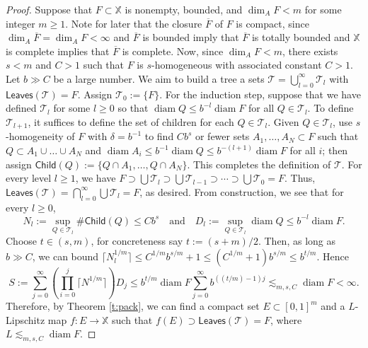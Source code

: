 \documentclass[12pt]{amsart}
\theoremstyle{definition}
\theoremstyle{remark}
\newcommand{\XX}{\mathbb{X}}
\newcommand{\diam}{\mathop\mathrm{diam}\nolimits}
\newcommand{\leaves}{\mathsf{Leaves}}
\newcommand{\Child}{\mathsf{Child}}
\numberwithin{figure}{section}
\numberwithin{equation}{section}
\begin{document}
\begin{proof}
Suppose that $F\subset\XX$ is nonempty, bounded, and $\dim_A F<m$ for some integer $m\geq 1$. Note for later that the closure $\overline{F}$ of $F$ is compact, since $\dim_A \overline{F}=\dim_A F<\infty$ and $\overline{F}$ is bounded imply that $\overline{F}$ is totally bounded and $\XX$ is complete implies that $\overline{F}$ is complete. Now, since $\dim_A F<m$, there exists $s<m$ and $C>1$ such that $F$ is $s$-homogeneous with associated constant $C>1$. Let $b\gg C$ be a large number. We aim to build a tree a sets $\mathcal{T}=\bigcup_{l=0}^\infty \mathcal{T}_l$ with $\leaves(\mathcal{T})=F$. Assign $\mathcal{T}_0:=\{F\}$. For the induction step, suppose that we have defined $\mathcal{T}_l$ for some $l\geq 0$ so that $\diam Q\leq b^{-l}\diam F$ for all $Q\in\mathcal{T}_l$. To define $\mathcal{T}_{l+1}$, it suffices to define the set of children for each $Q\in\mathcal{T}_l$. Given $Q\in\mathcal{T}_l$, use $s$-homogeneity of $F$ with $\delta=b^{-1}$ to find $C b^s$ or fewer sets $A_1,\dots, A_N\subset F$ such that $Q\subset A_1\cup\dots\cup A_N$ and $\diam A_i\leq b^{-1}\diam Q\leq b^{-(l+1)}\diam F$ for all $i$; then assign $\Child(Q):=\{Q\cap A_1,\dots,Q\cap A_N\}$. This completes the definition of $\mathcal{T}$. For every level $l\geq 1$, we have $F\supset \bigcup\mathcal{T}_l\supset \bigcup\mathcal{T}_{l-1}\supset\cdots \supset \bigcup\mathcal{T}_0 = F$. Thus, $\leaves(\mathcal{T})=\bigcap_{l=0}^\infty \bigcup\mathcal{T}_l=F$, as desired. From construction, we see that for every $l\geq 0$, $$N_l:=\sup_{Q\in\mathcal{T}_l}\#\Child(Q)\leq Cb^{s}\quad\text{and}\quad D_l:=\sup_{Q\in\mathcal{T}_l}\diam Q\leq b^{-l}\diam F.$$ Choose $t\in(s,m)$, for concreteness say $t:=(s+m)/2$. Then, as long as $b\gg C$, we can bound $\lceil N_l^{1/m}\rceil \leq C^{1/m}b^{s/m}+1\leq (C^{1/m}+1)b^{s/m}\leq b^{t/m}$. Hence \begin{equation} S:=\sum_{j=0}^\infty \left(\prod_{i=0}^j \lceil N^{1/m}\rceil\right) D_j \leq b^{t/m}\diam F\sum_{j=0}^\infty b^{((t/m)-1)j}\lesssim_{m,s,C}\diam F<\infty.\end{equation} Therefore, by Theorem \ref{t:pack}, we can find a compact set $E\subset[0,1]^m$ and a $L$-Lipschitz map $f:E\rightarrow\XX$ such that $f(E)\supset \leaves(\mathcal{T})=F$, where $L\lesssim_{m,s,C} \diam F$.


\end{proof}
\end{document}
